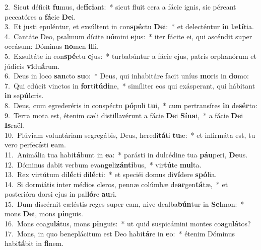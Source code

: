 {2.~}Sicut déficit \textbf{fu}mus, de\textbf{fí}\textbf{ci}ant:~* sicut fluit cera a fácie ignis, sic péreant peccatóres a \textbf{fá}cie \textbf{De}i.\\
{3.~}Et justi epuléntur, et exsúltent in con\textbf{spé}ctu \textbf{De}i:~* et delecténtur \textbf{in} læ\textbf{tí}tia.\\
{4.~}Cantáte Deo, psalmum dícite \textbf{nó}mini \textbf{e}jus:~* iter fácite ei, qui ascéndit super occásum: Dóminus \textbf{no}men \textbf{il}li.\\
{5.~}Exsultáte in con\textbf{spé}ctu \textbf{e}jus:~* turbabúntur a fácie ejus, patris orphanórum et júdicis \textbf{vi}du\textbf{á}rum.\\
{6.~}Deus in loco \textbf{san}cto \textbf{su}o:~* Deus, qui inhabitáre facit uníus \textbf{mo}ris in \textbf{do}mo:\\
{7.~}Qui edúcit vinctos in \textbf{for}ti\textbf{tú}\textbf{di}ne,~* simíliter eos qui exásperant, qui hábitant \textbf{in} se\textbf{púl}cris.\\
{8.~}Deus, cum egrederéris in conspéctu \textbf{pó}puli \textbf{tu}i,~* cum pertransíres \textbf{in} de\textbf{sér}to:\\
{9.~}Terra mota est, étenim cæli distillavérunt a fácie \textbf{De}i \textbf{Sí}\textbf{na}i,~* a fácie \textbf{De}i \textbf{Is}raël.\\
{10.~}Plúviam voluntáriam segregábis, Deus, heredi\textbf{tá}ti \textbf{tu}æ:~* et infirmáta est, tu vero perfe\textbf{cí}sti \textbf{e}am.\\
{11.~}Animália tua habi\textbf{tá}bunt in \textbf{e}a:~* parásti in dulcédine tua \textbf{páu}peri, \textbf{De}us.\\
{12.~}Dóminus dabit verbum evan\textbf{ge}li\textbf{zán}\textbf{ti}bus,~* vir\textbf{tú}te \textbf{mul}ta.\\
{13.~}Rex virtútum di\textbf{lé}cti di\textbf{lé}cti:~* et speciéi domus di\textbf{ví}dere \textbf{spó}lia.\\
{14.~}Si dormiátis inter médios cleros, pennæ colúmbæ de\textbf{ar}gen\textbf{tá}tæ,~* et posterióra dorsi ejus in pal\textbf{ló}re \textbf{au}ri.\\
{15.~}Dum discérnit cæléstis reges super eam, nive dealba\textbf{bún}tur in \textbf{Sel}mon:~* mons \textbf{De}i, mons \textbf{pin}guis.\\
{16.~}Mons coagu\textbf{lá}tus, mons \textbf{pin}guis:~* ut quid suspicámini montes co\textbf{a}gu\textbf{lá}tos?\\
{17.~}Mons, in quo beneplácitum est Deo habi\textbf{tá}re in \textbf{e}o:~* étenim Dóminus habi\textbf{tá}bit in \textbf{fi}nem.\\
